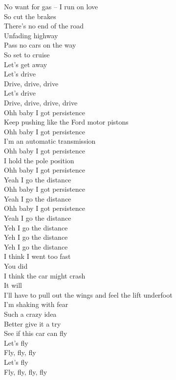 No want for gas -- I run on love\\
So cut the brakes\\
There's no end of the road\\
Unfading highway\\
Pass no cars on the way\\
So set to cruise\\
Let's get away\\

Let's drive\\
Drive, drive, drive\\
Let's drive\\
Drive, drive, drive, drive\\

Ohh baby I got persistence\\
Keep pushing like the Ford motor pistons\\
Ohh baby I got persistence\\
I'm an automatic transmission\\
Ohh baby I got persistence\\
I hold the pole position\\
Ohh baby I got persistence\\
Yeah I go the distance\\
Ohh baby I got persistence\\
Yeah I go the distance\\
Ohh baby I got persistence\\
Yeah I go the distance\\

Yeh I go the distance\\
Yeh I go the distance\\
Yeh I go the distance\\

I think I went too fast\\
You did\\
I think the car might crash\\
It will\\
I'll have to pull out the wings and feel the lift underfoot\\
I'm shaking with fear\\
Such a crazy idea\\
Better give it a try\\
See if this car can fly\\

Let's fly\\
Fly, fly, fly\\
Let's fly\\
Fly, fly, fly, fly\\

